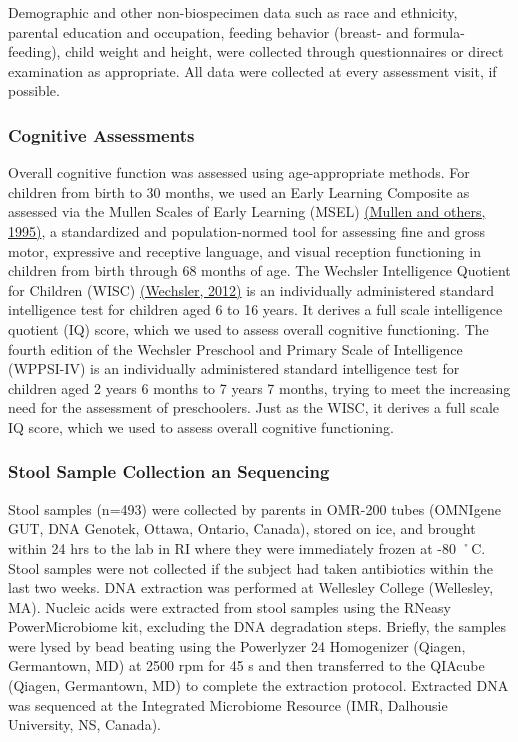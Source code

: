Demographic and other non-biospecimen data such as race and ethnicity,
parental education and occupation, feeding behavior (breast- and
formula-feeding), child weight and height, were collected through
questionnaires or direct examination as appropriate. All data were
collected at every assessment visit, if possible.

\subsubsection{Cognitive Assessments}

Overall cognitive function was assessed using age-appropriate methods.
For children from birth to 30 months, we used an Early Learning
Composite as assessed via the Mullen Scales of Early Learning (MSEL)
\href{https://www.zotero.org/google-docs/?NSyykd}{(Mullen and others,
1995)}, a standardized and population-normed tool for assessing fine and
gross motor, expressive and receptive language, and visual reception
functioning in children from birth through 68 months of age. The
Wechsler Intelligence Quotient for Children (WISC)
\href{https://www.zotero.org/google-docs/?OopdA1}{(Wechsler, 2012)} is
an individually administered standard intelligence test for children
aged 6 to 16 years. It derives a full scale intelligence quotient (IQ)
score, which we used to assess overall cognitive functioning. The fourth
edition of the Wechsler Preschool and Primary Scale of Intelligence
(WPPSI-IV) is an individually administered standard intelligence test
for children aged 2 years 6 months to 7 years 7 months, trying to meet
the increasing need for the assessment of preschoolers. Just as the
WISC, it derives a full scale IQ score, which we used to assess overall
cognitive functioning.

\subsubsection{Stool Sample Collection an
Sequencing}

Stool samples (n=493) were collected by parents in OMR-200 tubes
(OMNIgene GUT, DNA Genotek, Ottawa, Ontario, Canada), stored on ice, and
brought within 24 hrs to the lab in RI where they were immediately
frozen at -80 ˚C. Stool samples were not collected if the subject had
taken antibiotics within the last two weeks. DNA extraction was
performed at Wellesley College (Wellesley, MA). Nucleic acids were
extracted from stool samples using the RNeasy PowerMicrobiome kit,
excluding the DNA degradation steps. Briefly, the samples were lysed by
bead beating using the Powerlyzer 24 Homogenizer (Qiagen, Germantown,
MD) at 2500 rpm for 45 s and then transferred to the QIAcube (Qiagen,
Germantown, MD) to complete the extraction protocol. Extracted DNA was
sequenced at the Integrated Microbiome Resource (IMR, Dalhousie
University, NS, Canada).

